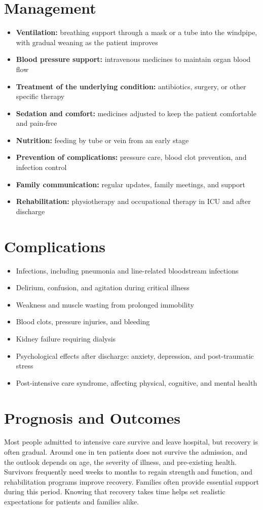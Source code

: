 \section*{Management}
\begin{itemize}
    \item \textbf{Ventilation:} breathing support through a mask or a tube into the windpipe, with gradual weaning as the patient improves
    \item \textbf{Blood pressure support:} intravenous medicines to maintain organ blood flow
    \item \textbf{Treatment of the underlying condition:} antibiotics, surgery, or other specific therapy
    \item \textbf{Sedation and comfort:} medicines adjusted to keep the patient comfortable and pain-free
    \item \textbf{Nutrition:} feeding by tube or vein from an early stage
    \item \textbf{Prevention of complications:} pressure care, blood clot prevention, and infection control
    \item \textbf{Family communication:} regular updates, family meetings, and support
    \item \textbf{Rehabilitation:} physiotherapy and occupational therapy in ICU and after discharge
\end{itemize}

\section*{Complications}
\begin{itemize}
    \item Infections, including pneumonia and line-related bloodstream infections
    \item Delirium, confusion, and agitation during critical illness
    \item Weakness and muscle wasting from prolonged immobility
    \item Blood clots, pressure injuries, and bleeding
    \item Kidney failure requiring dialysis
    \item Psychological effects after discharge: anxiety, depression, and post-traumatic stress
    \item Post-intensive care syndrome, affecting physical, cognitive, and mental health
\end{itemize}

\section*{Prognosis and Outcomes}
Most people admitted to intensive care survive and leave hospital, but recovery is often gradual. Around one in ten patients does not survive the admission, and the outlook depends on age, the severity of illness, and pre-existing health. Survivors frequently need weeks to months to regain strength and function, and rehabilitation programs improve recovery. Families often provide essential support during this period. Knowing that recovery takes time helps set realistic expectations for patients and families alike.

